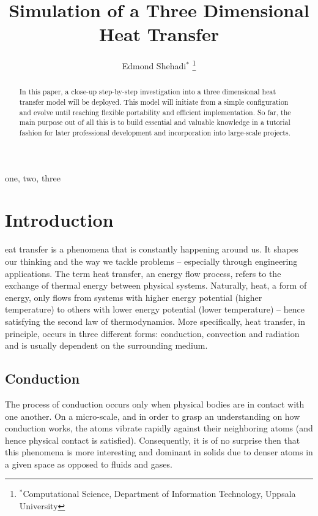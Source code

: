 \documentclass[a4paper,10pt]{IEEEtran}
\begin{document}
	
	\title{Simulation of a Three Dimensional Heat Transfer}
	\author{Edmond Shehadi$^{*}$%
		\thanks{$^{*}$Computational Science, Department of Information Technology, Uppsala University}%
	}
	\maketitle
	
	\begin{abstract}
		In this paper, a close-up step-by-step investigation into a three dimensional heat transfer model will be deployed. This model will initiate from a simple configuration and evolve until reaching flexible portability and efficient implementation. So far, the main purpose out of all this is to build essential and valuable knowledge in a tutorial fashion for later professional development and incorporation into large-scale projects.
	\end{abstract}
	
	\begin{IEEEkeywords}
		one, two, three
	\end{IEEEkeywords}
	
	\section{Introduction}
	eat transfer is a phenomena that is constantly happening around us. It shapes our thinking and the way we tackle problems -- especially through engineering applications. The term heat transfer, an energy flow process, refers to the exchange of thermal energy between physical systems. Naturally, heat, a form of energy, only flows from systems with higher energy potential (higher temperature) to others with lower energy potential (lower temperature) -- hence satisfying the second law of thermodynamics. More specifically, heat transfer, in principle, occurs in three different forms: conduction, convection and radiation and is usually dependent on the surrounding medium.
	\subsection{Conduction}
	The process of conduction occurs only when physical bodies are in contact with one another. On a micro-scale, and in order to grasp an understanding on how conduction works, the atoms vibrate rapidly against their neighboring atoms (and hence physical contact is satisfied). Consequently, it is of no surprise then that this phenomena is more interesting and dominant in solids due to denser atoms in a given space as opposed to fluids and gases.
\end{document}
